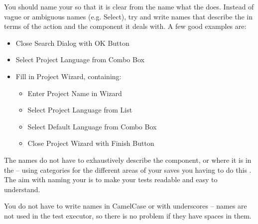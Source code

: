You should name your \gdcases{} so that it is clear from the name what the \gdcase{} does. Instead of vague or ambiguous names (e.g. Select), try and write names that describe the \gdcase{} in terms of the action and the component it deals with. A few good examples are:

\begin{itemize}
\item Close Search Dialog with OK Button
\item Select Project Language from Combo Box
\item Fill in Project Wizard, containing:
\begin{itemize}
\item Enter Project Name in Wizard
\item Select Project Language from List
\item Select Default Language from Combo Box
\item Close Project Wizard with Finish Button
\end{itemize}
\end{itemize}

The \gdcase{} names do not have to exhaustively describe the component, or where it is in the \gdaut{} -- using categories for the different areas of your \gdaut{} saves you having to do this . The aim with naming your \gdcases{} is to make your tests readable and easy to understand. 

You do not have to write \gdcase{} names in CamelCase or with underscores -- \gdcase{} names are not used in the test executor, so there is no problem if they have spaces in them. 
